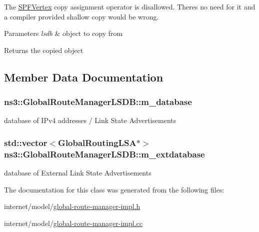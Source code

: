 The \hyperlink{classns3_1_1SPFVertex}{S\+P\+F\+Vertex} copy assignment operator is disallowed. There\textquotesingle{}s no need for it and a compiler provided shallow copy would be wrong. 


\begin{DoxyParams}{Parameters}
{\em lsdb} & object to copy from \\
\hline
\end{DoxyParams}
\begin{DoxyReturn}{Returns}
the copied object 
\end{DoxyReturn}


\subsection{Member Data Documentation}
\subsubsection[{\texorpdfstring{m\+\_\+database}{m_database}}]{ ns3\+::\+Global\+Route\+Manager\+L\+S\+D\+B\+::m\+\_\+database\hspace{0.3cm}{\ttfamily [private]}}\hypertarget{classns3_1_1GlobalRouteManagerLSDB_a87c05048fb7b513f7bd1e923f7d075a8}{}\label{classns3_1_1GlobalRouteManagerLSDB_a87c05048fb7b513f7bd1e923f7d075a8}


database of I\+Pv4 addresses / Link State Advertisements 

\subsubsection[{\texorpdfstring{m\+\_\+extdatabase}{m_extdatabase}}]{\setlength{\rightskip}{0pt plus 5cm}std\+::vector$<${\bf Global\+Routing\+L\+SA}$\ast$$>$ ns3\+::\+Global\+Route\+Manager\+L\+S\+D\+B\+::m\+\_\+extdatabase\hspace{0.3cm}{\ttfamily [private]}}\hypertarget{classns3_1_1GlobalRouteManagerLSDB_a71a8e59e594b19f9284b3f06e80ee770}{}\label{classns3_1_1GlobalRouteManagerLSDB_a71a8e59e594b19f9284b3f06e80ee770}


database of External Link State Advertisements 



The documentation for this class was generated from the following files\+:\begin{DoxyCompactItemize}
\item 
internet/model/\hyperlink{global-route-manager-impl_8h}{global-\/route-\/manager-\/impl.\+h}\item 
internet/model/\hyperlink{global-route-manager-impl_8cc}{global-\/route-\/manager-\/impl.\+cc}\end{DoxyCompactItemize}
